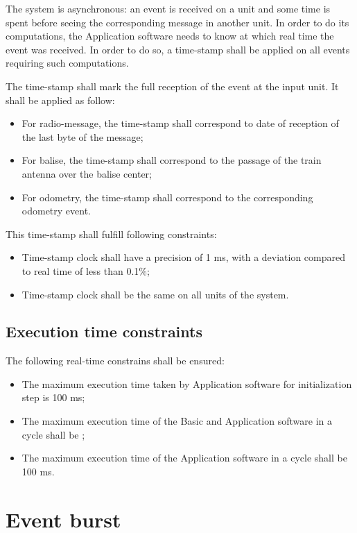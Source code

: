 The system is asynchronous: an event is received on a unit and some
time is spent before seeing the corresponding message in another
unit. In order to do its computations, the Application software needs
to know at which real time the event was received. In order to do so,
a time-stamp shall be applied on all events requiring such
computations. 

The time-stamp shall mark the full reception of the event at the input
unit. It shall be applied as follow:
\begin{itemize}
\item For radio-message, the time-stamp shall correspond to date of
  reception of the last byte of the message;
\item For balise, the time-stamp shall correspond to the passage of
  the train antenna over the balise center;
\item For odometry, the time-stamp shall correspond to the
  corresponding odometry event.
\end{itemize}

This time-stamp shall fulfill following constraints:
\begin{itemize}
\item Time-stamp clock shall have a precision of 1 ms, with a
  deviation compared to real time of less than 0.1\%;
\item Time-stamp clock shall be the same on all units of the system.
\end{itemize}

\subsection{Execution time constraints}
\label{sec:execution-time-constraints}

The following real-time constrains shall be ensured:
\begin{itemize}
\item The maximum execution time taken by Application software for
  initialization step is 100 ms;
\item The maximum execution time of the Basic and Application software
  in a cycle shall be ;
\item The maximum execution time of the Application software in a
  cycle shall be 100 ms.
\end{itemize}

\section{Event burst}

